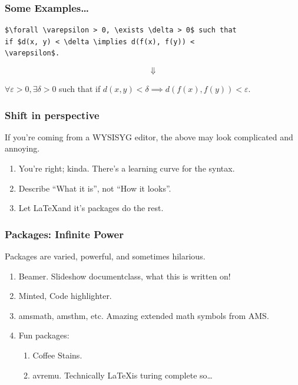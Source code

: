 \documentclass{beamer}
\begin{document}
\begin{frame}[fragile]
\frametitle{Some Examples\dots}

\begin{verbatim}
$\forall \varepsilon > 0, \exists \delta > 0$ such that 
if $d(x, y) < \delta \implies d(f(x), f(y)) < 
\varepsilon$.
\end{verbatim}

\[ \Downarrow \]

\begin{framed}
$\forall \varepsilon > 0, \exists \delta > 0$ such that 
if $d(x, y) < \delta \implies d(f(x), f(y)) < 
\varepsilon$.
\end{framed}

\end{frame}

\begin{frame}[fragile]
\frametitle{Shift in perspective}

If you're coming from a WYSISYG editor, the above may look complicated and
annoying.

\begin{enumerate}
\item<1-> You're right; kinda. There's a learning curve for the syntax.
\item<2-> Describe ``What it is'', not ``How it looks''.
\item<3-> Let \LaTeX\@ and it's packages do the rest.
\end{enumerate}

\end{frame}

\begin{frame}[fragile]
\frametitle{Packages: Infinite Power}

Packages are varied, powerful, and sometimes hilarious.

\begin{enumerate}
    \item<1-> Beamer. Slideshow documentclass, what this is written on!
    \item<2-> Minted, Code highlighter.
    \item<3-> amsmath, amsthm, etc. Amazing extended math symbols from AMS.
    \item<4-> Fun packages:
        \begin{enumerate}
            \item Coffee Stains.
            \item avremu. Technically \LaTeX\@ is turing complete so\dots
        \end{enumerate}
\end{enumerate}

\end{frame}
\end{document}
